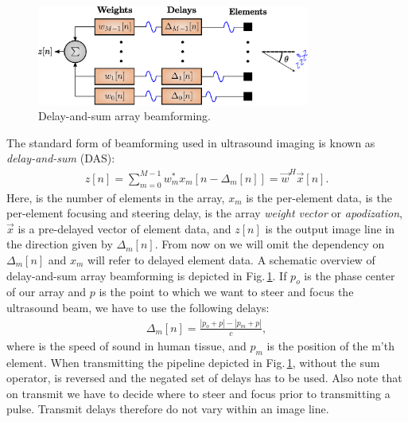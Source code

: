 \begin{figure}
\centering
\includegraphics[width=0.8\textwidth]{img/beamforming_das.eps}
\caption{Delay-and-sum array beamforming.}
\label{fig:das_background}
\end{figure}

The standard form of beamforming used in ultrasound imaging is known as \textit{delay-and-sum} (DAS): 
\begin{align}\label{eq:das_background}
z[n] = \sum_{m = 0}^{M-1}w_m^*x_m[n - \Delta_m[n]] = \vec{w}^H\vec{x}[n].
\end{align}
Here,  is the number of elements in the array, $x_m$ is the per-element data,  is the per-element focusing and steering delay,  is the array \textit{weight vector} or \textit{apodization}, $\vec{x}$ is a pre-delayed vector of element data, and $z[n]$ is the output image line in the direction given by $\Delta_m[n]$.  From now on we will omit the dependency on $\Delta_m[n]$ and $x_m$ will refer to delayed element data. A schematic overview of delay-and-sum array beamforming is depicted in Fig.\,\ref{fig:das_background}. If $p_o$ is the phase center of our array and $p$ is the point to which we want to steer and focus the ultrasound beam, we have to use the following delays:
\begin{align}
\Delta_m[n] =\frac{|p_o+p| - |p_m+p|}{c},
\end{align}
where  is the speed of sound in human tissue, and $p_m$ is the position of the m'th element. When transmitting the pipeline depicted in Fig.\,\ref{fig:das_background}, without the sum operator, is reversed and the negated set of delays has to be used. Also note that on transmit we have to decide where to steer and focus prior to transmitting a pulse. Transmit delays therefore do not vary within an image line.

